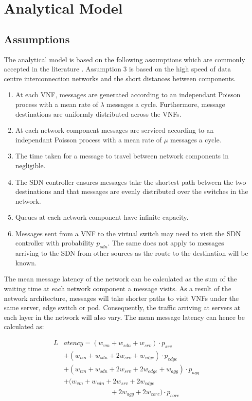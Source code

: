 
\section{Analytical Model}
\label{sec:analytical_model}

\subsection{Assumptions}
The analytical model is based on the following assumptions which are commonly accepted in the literature \cite{}. Assumption 3 is based on the high speed of data centre interconnection networks and the short distances between components.

\begin{enumerate}
\item At each VNF, messages are generated according to an independant Poisson process with a mean rate of $\lambda$ messages a cycle. Furthermore, message destinations are uniformly distributed across the VNFs.
\item At each network component messages are serviced according to an independant Poisson process with a mean rate of $\mu$ messages a cycle.
\item The time taken for a message to travel between network components in negligible.
\item The SDN controller ensures messages take the shortest path between the two destinations and that messages are evenly distributed over the switches in the network.
\item Queues at each network component have infinite capacity.
\item Messages sent from a VNF to the virtual switch may need to visit the SDN controller with probability $p_{sdn}$. The same does not apply to messages arriving to the SDN from other sources as the route to the destination will be known.
\end{enumerate}

The mean message latency of the network can be calculated as the sum of the waiting time at each network component a message visits. As a result of the network architecture, messages will take shorter paths to visit VNFs under the same server, edge switch or pod. Consequently, the traffic arriving at servers at each layer in the network will also vary. The mean message latency can hence be calculated as:

\begin{equation} 
\label{eq:mean_latency}
\begin{split}
L&atency = (w_{vm} + w_{sdn} + w_{srv}) \cdot p_{srv} \\
		&+ (w_{vm} + w_{sdn} + 2w_{srv} + w_{edge}) \cdot p_{edge} \\
	 	&+ (w_{vm} + w_{sdn} + 2w_{srv} + 2w_{edge} + w_{agg}) \cdot p_{agg} \\
	 	&+ (w_{vm} + w_{sdn} + 2w_{srv} + 2w_{edge}  \\
		& \;\;\;\quad\qquad\quad\qquad + 2w_{agg} + 2w_{core})\cdot p_{core}
\end{split}
\end{equation}

